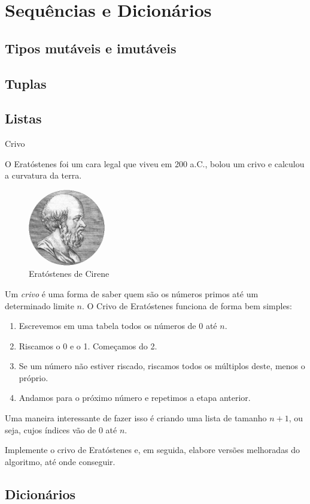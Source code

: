 \chapter{Sequências e Dicionários}

    \section*{Tipos mutáveis e imutáveis}

    \section*{Tuplas}

    \section*{Listas}

    \begin{problem}{Crivo}
	
	O Eratóstenes foi um cara legal que viveu em 200 a.C., bolou um crivo e calculou a curvatura da terra.
	
    \begin{figure}[h]
        \medskip
        \centering
	    \includegraphics[width=0.3\textwidth]{figs/eratostenes.png}
        \caption{Eratóstenes de Cirene}
        \label{p:crivo}
    \end{figure}
	
	Um \textit{crivo} é uma forma de saber quem são os números primos até um determinado limite $n$. O Crivo de Eratóstenes funciona de forma bem simples:
	\begin{enumerate}
		\item Escrevemos em uma tabela todos os números de 0 até $n$.
		\item Riscamos o 0 e o 1. Começamos do 2.
		
		\item Se um número não estiver riscado, riscamos todos os múltiplos deste, menos o próprio.
		
		\item Andamos para o próximo número e repetimos a etapa anterior.		
	\end{enumerate}
	Uma maneira interessante de fazer isso é criando uma lista de tamanho $n + 1$, ou seja, cujos índices vão de 0 até $n$. \par

	\proposal Implemente o crivo de Eratóstenes e, em seguida, elabore versões melhoradas do algoritmo, até onde conseguir.

    \end{problem}

    \section*{Dicionários}

   